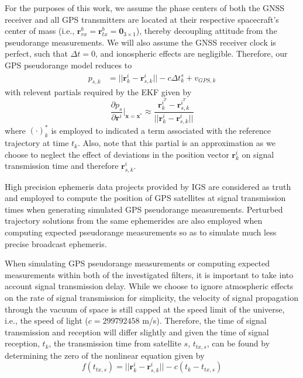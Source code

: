 \documentclass[letterpaper, paper,11pt]{AAS}		%
\begin{document}
For the purposes of this work, we assume the phase centers of both the GNSS receiver and all GPS transmitters are located at their respective spacecraft's center of mass (i.e., $\mathbf{r}_{rx}^b = \mathbf{r}_{tx}^b = \mathbf{0}_{3\times1}$), thereby decoupling attitude from the pseudorange measurements. We will also assume the GNSS receiver clock is perfect, such that $\Delta t = 0$, and ionospheric effects are negligible. Therefore, our GPS pseudorange model reduces to
\begin{align}
	p_{s,k} &= ||\mathbf{r}_k^i - \mathbf{r}_{s,k}^i|| - c\Delta t_k^s + v_{GPS,k}
\end{align}
with relevent partials required by the EKF given by
\begin{equation}
	\frac{\partial p_s}{\partial \mathbf{r}^i}\bigg|_{\mathbf{x}=\mathbf{x}^*} \approx \frac{\mathbf{r}_k^{i^T} - \mathbf{r}_{s,k}^{i^T}}{||\mathbf{r}_k^i - \mathbf{r}_{s,k}^i||}
	\label{eqn:ppart}
\end{equation}
where $(\cdot)^*_k$ is employed to indicated a term associated with the reference trajectory at time $t_k$. Also, note that this partial is an approximation as we choose to neglect the effect of deviations in the position vector $\mathbf{r}_k^i$ on signal transmission time and therefore $\mathbf{r}_{s,k}^i$.

High precision ephemeris data projects provided by IGS \cite{IGSproducts} are considered as truth and employed to compute the position of GPS satellites at signal transmission times when generating simulated GPS pseudorange measurements. Perturbed trajectory solutions from the same ephemerides are also employed when computing expected pseudorange measurements so as to simulate much less precise broadcast ephemeris. 

When simulating GPS pseudorange measurements or computing expected measurements within both of the investigated filters, it is important to take into account signal transmission delay. While we choose to ignore atmospheric effects on the rate of signal transmission for simplicity, the velocity of signal propagation through the vacuum of space is still capped at the speed limit of the universe, i.e., the speed of light ($c=299792458$ m/s). Therefore, the time of signal transmission and reception will differ slightly and given the time of signal reception, $t_k$, the transmission time from satellite $s$, $t_{tx,s}$, can be found by determining the zero of the nonlinear equation given by 
\begin{equation}
	f(t_{tx,s}) = ||\mathbf{r}_k^i - \mathbf{r}_{s,k}^i|| - c(t_k - t_{tx,s})
\end{equation}
\end{document}
